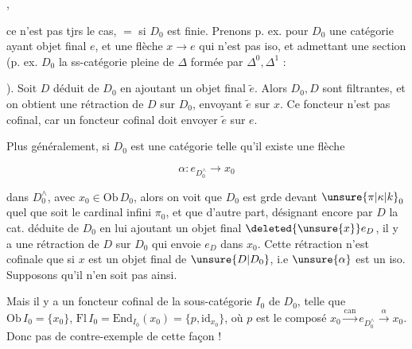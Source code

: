 ,

ce n'est pas tjrs le cas, $=$ si $D_0$ est finie. Prenons p. ex. pour $D_0$ une catégorie ayant objet final  $e$, et une flèche $x\longrightarrow e$ qui n'est pas iso, et admettant une section (p. ex. $D_0$ la ss-catégorie pleine de $\mathbb{\Delta}$ formée par $\mathbb{\Delta}^0,\mathbb{\Delta}^1$ :


). Soit $D$ déduit de $D_0$ en ajoutant un objet final $\widetilde e$. Alors $D_0,D$ sont filtrantes, et on obtient une rétraction de $D$ sur $D_0$, envoyant $\widetilde e$ sur $x$. Ce foncteur n'est pas cofinal, car  un foncteur cofinal doit envoyer $\widetilde e$ sur $e$.

Plus généralement, si $D_0$ est une catégorie telle qu'il existe une flèche

{\makeatletter\tagsleft@true\makeatother
\[ \alpha:e_{D_0^{\wedge}}\longrightarrow x_0 \tag*{$(*)$} \]
}

dans $D_0^{\wedge}$, avec $x_0\in\mathrm{Ob}\,D_0$, alors on voit que $D_0$ est grde devant $\unsure{\pi|\kappa|k}_0$ quel que soit le cardinal infini $\pi_0$, et que d'autre part, désignant encore par $D$ la cat. déduite de $D_0$ en lui ajoutant un objet final  $\deleted{\unsure{x}}e_D$, il y a une rétraction de $D$ sur $D_0$ qui envoie $e_D$ dans $x_0$. Cette rétraction n'est cofinale que si $x$ est un objet final de $\unsure{D|D_0}$, i.e  $\unsure{\alpha}$ est un iso. Supposons qu'il n'en soit pas ainsi.


Mais il y a un foncteur cofinal de la sous-catégorie $I_0$ de $D_0$, telle que $\mathrm{Ob}\,I_0=\{x_0\}$, $\mathrm{Fl}\,I_0=\mathrm{End}_{I_0}(x_0)=\{p,\mathrm{id}_{x_0}\}$, où $p$ est le composé $x_0\xrightarrow{\mathrm{can}}e_{D_0^{\wedge}}\xrightarrow{\alpha}x_0$. Donc pas de contre-exemple de cette façon !
